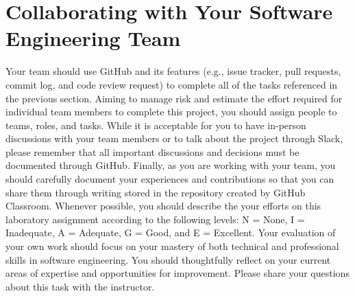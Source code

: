 \documentclass[11pt]{article}
\begin{document}

\section*{Collaborating with Your Software Engineering Team}

Your team should use GitHub and its features (e.g., issue tracker, pull
requests, commit log, and code review request) to complete all of the tasks
referenced in the previous section.
%
Aiming to manage risk and estimate the effort required for individual team
members to complete this project, you should assign people to teams, roles, and
tasks. While it is acceptable for you to have in-person discussions with your
team members or to talk about the project through Slack, please remember that
all important discussions and decisions must be documented through GitHub.
Finally, as you are working with your team, you should carefully document your
experiences and contributions so that you can share them through writing stored
in the repository created by GitHub Classroom.
%
Whenever possible, you should describe the your efforts on this laboratory
assignment according to the following levels: N = None, I = Inadequate, A =
Adequate, G = Good, and E = Excellent. Your evaluation of your own work should
focus on your mastery of both technical and professional skills in software
engineering. You should thoughtfully reflect on your current areas of expertise
and opportunities for improvement. Please share your questions about this task
with the instructor.
\end{document}

